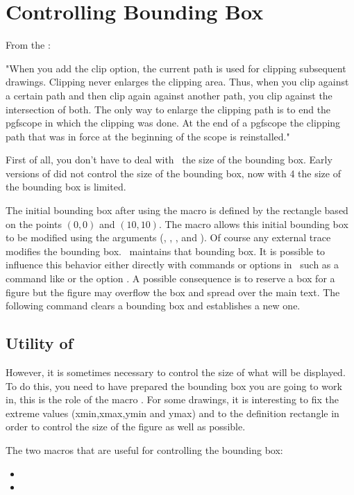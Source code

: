 \section{Controlling Bounding Box}
From the  : 

"When you add the clip option, the current path is used for clipping subsequent drawings. Clipping never enlarges the clipping area. Thus, when you clip against a certain path and then clip again against another path, you clip against the intersection of both.
The only way to enlarge the clipping path is to end the {pgfscope} in which the clipping was done. At the end of a {pgfscope} the clipping path that was in force at the beginning of the scope is reinstalled."


First of all, you don't have to deal with \TIKZ\ the size of the bounding box. Early versions of  did not control the size of the bounding box, now with \tkzNamePack{\tkznameofpack} 4 the size of the bounding box is limited.

The initial bounding box after using the macro  is defined by the rectangle based on the points $(0,0)$ and $(10,10)$. The  macro allows this initial bounding box to be modified using the arguments (, , , and ). Of course any external trace modifies the bounding box. \TIKZ\ maintains that bounding box. It is possible to influence this behavior either directly with commands or options in \TIKZ\ such as a command like  or the option . A possible consequence is to reserve a box for a figure but the figure may overflow the box and spread over the main text.
The following command  clears a bounding box and establishes a new one.

\subsection{Utility of } 
 However, it is sometimes necessary to control the size of what will be displayed.
 To do this, you need to have prepared the bounding box you are going to work in, this is the role of the   macro .  For some drawings, it is interesting to fix the extreme values (xmin,xmax,ymin and ymax) and to  the definition rectangle in order to control the size of the figure as well as possible.

The two macros that are useful for controlling the bounding box:
\begin{itemize}
   \item {}
   \item {}
\end{itemize}
\vspace{20pt}

